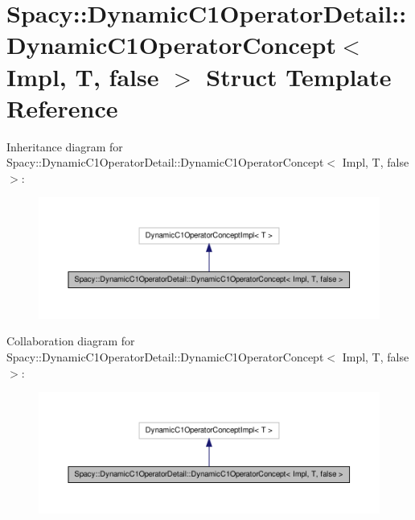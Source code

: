 \hypertarget{structSpacy_1_1DynamicC1OperatorDetail_1_1DynamicC1OperatorConcept_3_01Impl_00_01T_00_01false_01_4}{\section{\-Spacy\-:\-:\-Dynamic\-C1\-Operator\-Detail\-:\-:\-Dynamic\-C1\-Operator\-Concept$<$ \-Impl, \-T, false $>$ \-Struct \-Template \-Reference}
\label{structSpacy_1_1DynamicC1OperatorDetail_1_1DynamicC1OperatorConcept_3_01Impl_00_01T_00_01false_01_4}
}


\-Inheritance diagram for \-Spacy\-:\-:\-Dynamic\-C1\-Operator\-Detail\-:\-:\-Dynamic\-C1\-Operator\-Concept$<$ \-Impl, \-T, false $>$\-:
\nopagebreak
\begin{figure}[H]
\begin{center}
\leavevmode
\includegraphics[width=350pt]{structSpacy_1_1DynamicC1OperatorDetail_1_1DynamicC1OperatorConcept_3_01Impl_00_01T_00_01false_01_4__inherit__graph}
\end{center}
\end{figure}


\-Collaboration diagram for \-Spacy\-:\-:\-Dynamic\-C1\-Operator\-Detail\-:\-:\-Dynamic\-C1\-Operator\-Concept$<$ \-Impl, \-T, false $>$\-:
\nopagebreak
\begin{figure}[H]
\begin{center}
\leavevmode
\includegraphics[width=350pt]{structSpacy_1_1DynamicC1OperatorDetail_1_1DynamicC1OperatorConcept_3_01Impl_00_01T_00_01false_01_4__coll__graph}
\end{center}
\end{figure}
